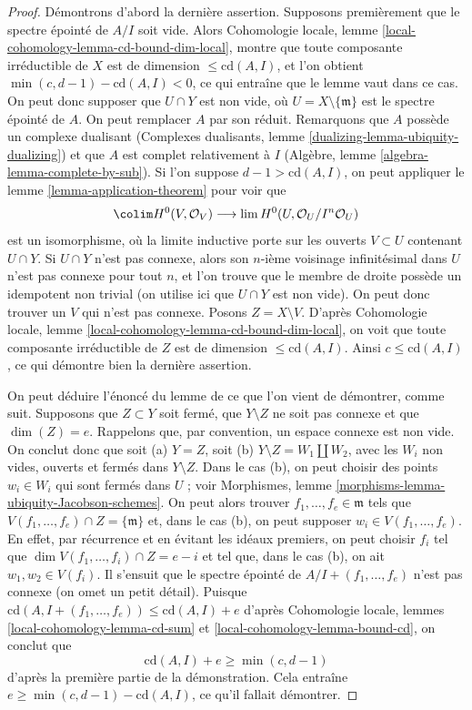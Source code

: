 \begin{proof}
Démontrons d'abord la dernière assertion. Supposons premièrement que le spectre
épointé de $A/I$ soit vide. Alors
Cohomologie locale, lemme \ref{local-cohomology-lemma-cd-bound-dim-local},
montre que toute composante irréductible de $X$ est de dimension
$\leq \text{cd}(A, I)$, et l'on obtient $\min(c, d - 1) - \text{cd}(A, I) < 0$,
ce qui entraîne que le lemme vaut dans ce cas. On peut donc supposer que
$U \cap Y$ est non vide, où $U = X \setminus \{\mathfrak m\}$
est le spectre épointé de $A$. On peut remplacer $A$ par son réduit.
Remarquons que $A$ possède un complexe dualisant
(Complexes dualisants, lemme \ref{dualizing-lemma-ubiquity-dualizing})
et que $A$ est complet relativement à $I$
(Algèbre, lemme \ref{algebra-lemma-complete-by-sub}).
Si l'on suppose $d - 1 > \text{cd}(A, I)$, on peut appliquer le
lemme \ref{lemma-application-theorem} pour voir que
$$
\colim H^0(V, \mathcal{O}_V)
\longrightarrow
\lim H^0(U, \mathcal{O}_U/I^n\mathcal{O}_U)
$$
est un isomorphisme, où la limite inductive porte sur les ouverts $V \subset U$
contenant $U \cap Y$. Si $U \cap Y$ n'est pas connexe, alors
son $n$-ième voisinage infinitésimal dans $U$ n'est pas connexe
pour tout $n$, et l'on trouve que le
membre de droite possède un idempotent non trivial (on utilise ici
que $U \cap Y$ est non vide).
On peut donc trouver un $V$ qui n'est pas connexe.
Posons $Z = X \setminus V$. D'après
Cohomologie locale, lemme \ref{local-cohomology-lemma-cd-bound-dim-local},
on voit que toute composante irréductible de $Z$ est de dimension
$\leq \text{cd}(A, I)$. Ainsi $c \leq \text{cd}(A, I)$, ce qui
démontre bien la dernière assertion.

\medskip\noindent
On peut déduire l'énoncé du lemme de ce que l'on vient de démontrer,
comme suit. Supposons que $Z \subset Y$ soit fermé, que $Y \setminus Z$ ne soit pas
connexe et que $\dim(Z) = e$. Rappelons que, par convention, un espace connexe est non vide.
On conclut donc que soit (a) $Y = Z$, soit (b)
$Y \setminus Z = W_1 \amalg W_2$, avec les $W_i$ non vides, ouverts et fermés
dans $Y \setminus Z$. Dans le cas (b), on peut choisir des points $w_i \in W_i$
qui sont fermés dans $U$ ; voir
Morphismes, lemme \ref{morphisms-lemma-ubiquity-Jacobson-schemes}.
On peut alors trouver $f_1, \ldots, f_e \in \mathfrak m$
tels que $V(f_1, \ldots, f_e) \cap Z = \{\mathfrak m\}$
et, dans le cas (b), on peut supposer $w_i \in V(f_1, \ldots, f_e)$.
En effet, par récurrence et en évitant les idéaux premiers, on peut
choisir $f_i$ tel que $\dim V(f_1, \ldots, f_i) \cap Z = e - i$
et tel que, dans le cas (b), on ait $w_1, w_2 \in V(f_i)$.
Il s'ensuit que le spectre épointé de $A/I + (f_1, \ldots, f_e)$
n'est pas connexe (on omet un petit détail). Puisque
$\text{cd}(A, I + (f_1, \ldots, f_e)) \leq \text{cd}(A, I) + e$ d'après
Cohomologie locale, lemmes \ref{local-cohomology-lemma-cd-sum} et
\ref{local-cohomology-lemma-bound-cd}, on conclut que
$$
\text{cd}(A, I) + e \geq \min(c, d - 1)
$$
d'après la première partie de la démonstration. Cela entraîne
$e \geq \min(c, d - 1) - \text{cd}(A, I)$, ce qu'il fallait démontrer.
\end{proof}

